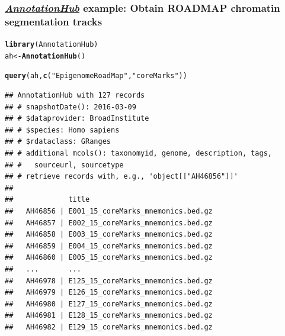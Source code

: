 \documentclass{beamer}\usepackage[]{graphicx}\usepackage[]{color}
\makeatletter
\newcommand{\hlstr}[1]{\textcolor[rgb]{0.192,0.494,0.8}{#1}}%
\newcommand{\hlstd}[1]{\textcolor[rgb]{0.345,0.345,0.345}{#1}}%
\newcommand{\hlkwb}[1]{\textcolor[rgb]{0.69,0.353,0.396}{#1}}%
\newcommand{\hlkwd}[1]{\textcolor[rgb]{0.737,0.353,0.396}{\textbf{#1}}}%
\newenvironment{kframe}{%
 \def\at@end@of@kframe{}%
 \ifinner\ifhmode%
  \def\at@end@of@kframe{\end{minipage}}%
  \begin{minipage}{\columnwidth}%
 \fi\fi%
 \def\FrameCommand##1{\hskip\@totalleftmargin \hskip-\fboxsep
 \colorbox{shadecolor}{##1}\hskip-\fboxsep
     \hskip-\linewidth \hskip-\@totalleftmargin \hskip\columnwidth}%
 \MakeFramed {\advance\hsize-\width
   \@totalleftmargin\z@ \linewidth\hsize
   \@setminipage}}%
 {\par\unskip\endMakeFramed%
 \at@end@of@kframe}
\newenvironment{knitrout}{}{} %
\newcommand{\Rpackage}[1]{{\usebeamercolor[fg]{structure} \textsl{#1}}}
\newcommand\Biocpkg[1]{%
  {\href{http://bioconductor.org/packages/release/bioc/html/#1.html}%
    {\Rpackage{#1}}}}
\makeatother
\begin{document}
\begin{frame}[fragile]
  \frametitle{\Biocpkg{AnnotationHub} example: Obtain ROADMAP chromatin segmentation tracks}
\begin{knitrout}\tiny
{}\color{fgcolor}\begin{kframe}
\begin{alltt}
\hlkwd{library}\hlstd{(AnnotationHub)}
\hlstd{ah} \hlkwb{<-} \hlkwd{AnnotationHub}\hlstd{()}
\end{alltt}


{\ttfamily\noindent\itshape\color{messagecolor}{\#\# snapshotDate(): 2016-03-09}}\begin{alltt}
\hlkwd{query}\hlstd{(ah,} \hlkwd{c}\hlstd{(}\hlstr{"EpigenomeRoadMap"}\hlstd{,} \hlstr{"coreMarks"}\hlstd{))}
\end{alltt}
\begin{verbatim}
## AnnotationHub with 127 records
## # snapshotDate(): 2016-03-09 
## # $dataprovider: BroadInstitute
## # $species: Homo sapiens
## # $rdataclass: GRanges
## # additional mcols(): taxonomyid, genome, description, tags,
## #   sourceurl, sourcetype 
## # retrieve records with, e.g., 'object[["AH46856"]]' 
## 
##             title                             
##   AH46856 | E001_15_coreMarks_mnemonics.bed.gz
##   AH46857 | E002_15_coreMarks_mnemonics.bed.gz
##   AH46858 | E003_15_coreMarks_mnemonics.bed.gz
##   AH46859 | E004_15_coreMarks_mnemonics.bed.gz
##   AH46860 | E005_15_coreMarks_mnemonics.bed.gz
##   ...       ...                               
##   AH46978 | E125_15_coreMarks_mnemonics.bed.gz
##   AH46979 | E126_15_coreMarks_mnemonics.bed.gz
##   AH46980 | E127_15_coreMarks_mnemonics.bed.gz
##   AH46981 | E128_15_coreMarks_mnemonics.bed.gz
##   AH46982 | E129_15_coreMarks_mnemonics.bed.gz
\end{verbatim}
\end{kframe}
\end{knitrout}
\end{frame}
\end{document}
